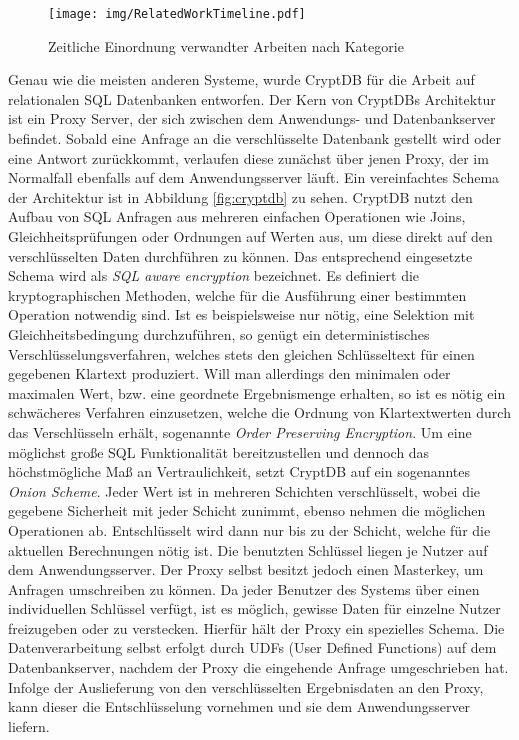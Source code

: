 \begin{figure}
	\texttt{[image: img/RelatedWorkTimeline.pdf]}
	\centering
	\caption{Zeitliche Einordnung verwandter Arbeiten nach Kategorie}
	\label{fig:timeline}
\end{figure}

Genau wie die meisten anderen Systeme, wurde CryptDB \cite{Popa2011}\cite{Popa2012} für die Arbeit auf relationalen SQL Datenbanken entworfen. Der Kern von CryptDBs Architektur ist ein Proxy Server, der sich zwischen dem Anwendungs- und  Datenbankserver befindet. Sobald eine Anfrage an die verschlüsselte Datenbank gestellt wird oder eine Antwort zurückkommt, verlaufen diese zunächst über jenen Proxy, der im Normalfall ebenfalls auf dem Anwendungsserver läuft. Ein vereinfachtes Schema der Architektur ist in Abbildung \ref{fig:cryptdb} zu sehen. CryptDB nutzt den Aufbau von SQL Anfragen aus mehreren einfachen Operationen wie Joins, Gleichheitsprüfungen oder Ordnungen auf Werten aus, um diese direkt auf den verschlüsselten Daten durchführen zu können. Das entsprechend eingesetzte Schema wird als \textit{SQL aware encryption} bezeichnet. Es definiert die kryptographischen Methoden, welche für die Ausführung einer bestimmten Operation notwendig sind. Ist es beispielsweise nur nötig, eine Selektion mit Gleichheitsbedingung durchzuführen, so genügt ein deterministisches Verschlüsselungsverfahren, welches stets den gleichen Schlüsseltext für einen gegebenen Klartext produziert. Will man allerdings den minimalen oder maximalen Wert, bzw. eine geordnete Ergebnismenge erhalten, so ist es nötig ein schwächeres Verfahren einzusetzen, welche die Ordnung von Klartextwerten durch das Verschlüsseln erhält, sogenannte \textit{Order Preserving Encryption}. Um eine möglichst große SQL Funktionalität bereitzustellen und dennoch das höchstmögliche Maß an Vertraulichkeit, setzt CryptDB auf ein sogenanntes \textit{Onion Scheme}. Jeder Wert ist in mehreren Schichten verschlüsselt, wobei die gegebene Sicherheit mit jeder Schicht zunimmt, ebenso nehmen die möglichen Operationen ab. Entschlüsselt wird dann nur bis zu der Schicht, welche für die aktuellen Berechnungen nötig ist. Die benutzten Schlüssel liegen je Nutzer auf dem Anwendungsserver. Der Proxy selbst besitzt jedoch einen Masterkey, um Anfragen umschreiben zu können. Da jeder Benutzer des Systems über einen individuellen Schlüssel verfügt, ist es möglich, gewisse Daten für einzelne Nutzer freizugeben oder zu verstecken. Hierfür hält der Proxy ein spezielles Schema. Die Datenverarbeitung selbst erfolgt durch UDFs (User Defined Functions) auf dem Datenbankserver, nachdem der Proxy die eingehende Anfrage umgeschrieben hat. Infolge der Auslieferung von den verschlüsselten Ergebnisdaten an den Proxy, kann dieser die Entschlüsselung vornehmen und sie dem Anwendungsserver liefern.

